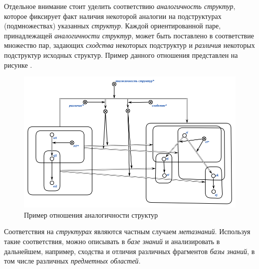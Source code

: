 \bigskip
Отдельное внимание стоит уделить соответствию \textit{аналогичность структур}, которое фиксирует факт наличия некоторой аналогии на подструктурах (подмножествах) указанных \textit{структур}. Каждой ориентированной паре, принадлежащей \textit{аналогичности структур}, может быть поставлено в соответствие множество пар, задающих \textit{сходства} некоторых подструктур и \textit{различия} некоторых подструктур исходных структур. Пример данного отношения представлен на рисунке \textit{}.


\begin{SCn}



\end{SCn}

\begin{figure}[H]
	\includegraphics[scale=0.7]{author/part2/figures/chapter_kb/analogy.png}
	\caption{Пример отношения аналогичности структур}
	\label{fig:analogy_of_structures}
\end{figure}

Соответствия на \textit{структурах} являются частным случаем \textit{метазнаний}. Используя такие соответствия, можно описывать в \textit{базе знаний} и анализировать в дальнейшем, например, сходства и отличия различных фрагментов \textit{базы знаний}, в том числе различных \textit{предметных областей}.

